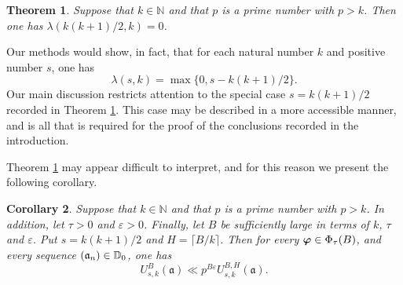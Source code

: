\documentclass[12pt,reqno]{amsart}
\newtheorem{theorem}{Theorem}[section]
\newtheorem{corollary}[theorem]{Corollary}
\theoremstyle{definition}
\theoremstyle{remark}
\numberwithin{equation}{section}
\def\dbN{{\mathbb N}} \def\dbO{{\mathbb O}} \def\dbP{{\mathbb P}}
\def\gra{{\mathfrak a}}\def\grA{{\mathfrak A}}\def\bfgra{{\boldsymbol \gra}}
\def\lam{{\lambda}} \def\Lam{{\Lambda}} \def\Lamtil{{\widetilde \Lambda}}
\def\eps{\varepsilon}
\begin{document}
\begin{theorem}\label{theorem3.1} Suppose that $k\in \dbN$ and that $p$ is a prime 
number with $p>k$. Then one has $\lam(k(k+1)/2,k)=0$.
\end{theorem}

Our methods would show, in fact, that for each natural number $k$ and positive number 
$s$, one has
\begin{equation}\label{3.15}
\lam(s,k)=\max\{ 0,s-k(k+1)/2\}.
\end{equation}
Our main discussion restricts attention to the special case $s=k(k+1)/2$ recorded in 
Theorem \ref{theorem3.1}. This case may be described in a more accessible manner, and is 
all that is required for the proof of the conclusions recorded in the introduction.

Theorem \ref{theorem3.1} may appear difficult to interpret, and for this reason we present 
the following corollary.

\begin{corollary}\label{corollary3.2} Suppose that $k\in \dbN$ and that $p$ is a prime 
number with $p>k$. In addition, let $\tau>0$ and $\eps>0$. Finally, let $B$ be sufficiently 
large in terms of $k$, $\tau$ and $\eps$. Put $s=k(k+1)/2$ and $H=\lceil B/k\rceil$. 
Then for every ${\boldsymbol \varphi}\in \Phi_\tau(B)$, and every sequence $(\gra_n)\in \dbD_0$, one 
has
\begin{equation}\label{3.16}
U_{s,k}^B(\bfgra)\ll p^{B\eps}U_{s,k}^{B,H}(\bfgra).
\end{equation}
\end{corollary}
\end{document}
